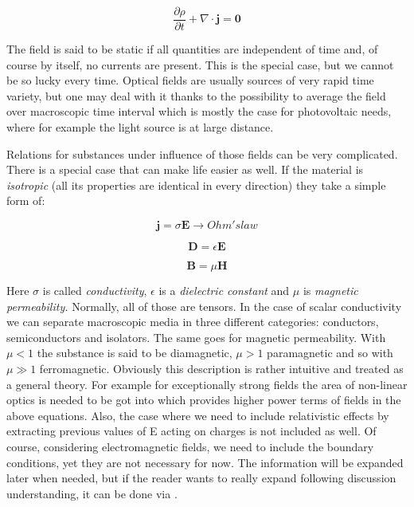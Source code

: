 \begin{equation}
\frac{\partial\rho}{\partial t} + \nabla \cdot \mathbf{j = 0}
\end{equation}

The field is said to be static if all quantities are independent of time
and, of course by itself, no currents are present. This is the special case, but we
cannot be so lucky every time. Optical fields are usually sources of
very rapid time variety, but one may deal with it thanks to the
possibility to average the field over macroscopic time interval which is
mostly the case for photovoltaic needs, where for example the light
source is at large distance.

Relations for substances under influence of those fields can be very
complicated. There is a special case that can make life easier as well.
If the material is \emph{isotropic} (all its properties are identical in
every direction) they take a simple form of:

\begin{equation}
\mathbf{j} = \sigma\mathbf{E \rightarrow} Ohm's law
\end{equation}

\begin{equation}
\mathbf{D =}\epsilon\mathbf{E}
\end{equation}

\begin{equation}
\mathbf{B =}\mu\mathbf{H}
\end{equation}

Here \(\sigma\) is called \emph{conductivity}, \(\epsilon\) is a
\emph{dielectric constant} and \(\mu\) is \emph{magnetic permeability.}
Normally, all of those are tensors. In the case of scalar conductivity
we can separate macroscopic media in three different categories:
conductors, semiconductors and isolators. The same goes for magnetic
permeability. With \(\mu < 1\) the substance is said to be diamagnetic,
\(\mu > 1\) paramagnetic and so with \(\mu \gg 1\) ferromagnetic.
Obviously this description is rather intuitive and treated as a general
theory. For example for exceptionally strong fields the area of
non-linear optics is needed to be got into which provides higher power
terms of fields in the above equations. Also, the case where we need to
include relativistic effects by extracting previous values of E acting
on charges is not included as well. Of course, considering electromagnetic fields, we need to include the boundary conditions, yet they are not necessary for now. The information will be expanded later when needed, but if the reader wants to really expand following discussion understanding, it can be done via \cite{Born1999} \cite{Jackson}.


